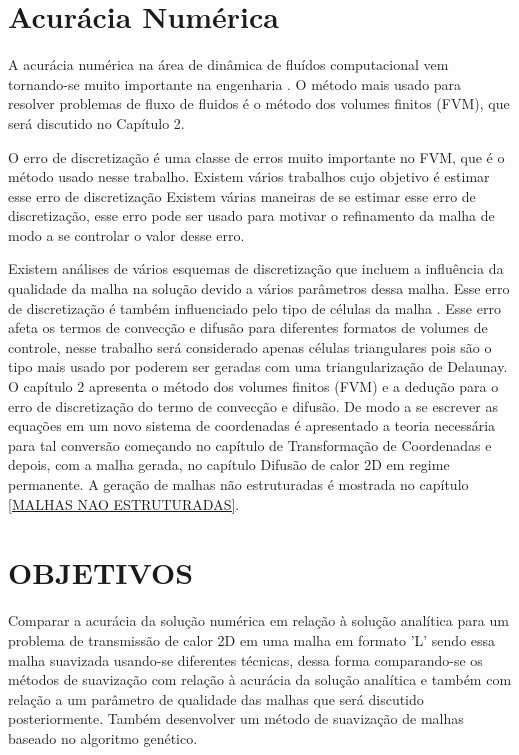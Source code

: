 \section{Acurácia Numérica}
A acurácia numérica na área de dinâmica de fluídos computacional vem tornando-se muito importante na engenharia \cite{doi:10.1080/10407791003685155}. O método mais usado para resolver problemas de fluxo de fluidos é o método dos volumes finitos (FVM), que será discutido no Capítulo 2.

O erro de discretização é uma classe de erros muito importante no FVM, que é o método usado nesse trabalho. Existem vários trabalhos cujo objetivo é estimar esse erro de discretização \cite{Muzaferija2014} \cite{Jasak1996} Existem várias maneiras de se estimar esse erro de discretização, esse erro pode ser usado para motivar o refinamento da malha de modo a se controlar o valor desse erro.

Existem análises de vários esquemas de discretização que incluem a influência da qualidade da malha na solução devido a vários parâmetros dessa malha. Esse erro de discretização é também influenciado pelo tipo de células da malha \cite{doi:10.1080/10407791003685155}. Esse erro afeta os termos de convecção e difusão para diferentes formatos de volumes de controle, nesse trabalho será considerado apenas células triangulares pois são o tipo mais usado por poderem ser geradas com uma triangularização de Delaunay. O capítulo 2 apresenta o método dos volumes finitos (FVM) e a dedução para o erro de discretização do termo de convecção e difusão. De modo a se escrever as equações em um novo sistema de coordenadas é apresentado a teoria necessária para tal conversão começando no capítulo de Transformação de Coordenadas e depois, com a malha gerada, no capítulo Difusão de calor 2D em regime permanente. A geração de malhas não estruturadas é mostrada no capítulo \ref{MALHAS NAO ESTRUTURADAS}.

\section{OBJETIVOS}

Comparar a acurácia da solução numérica em relação à solução analítica para um problema de transmissão de calor 2D em uma malha em formato 'L' sendo essa malha suavizada usando-se diferentes técnicas, dessa forma comparando-se os métodos de suavização com relação à acurácia da solução analítica e também com relação a um parâmetro de qualidade das malhas que será discutido posteriormente.
Também desenvolver um método de suavização de malhas baseado no algoritmo genético.

